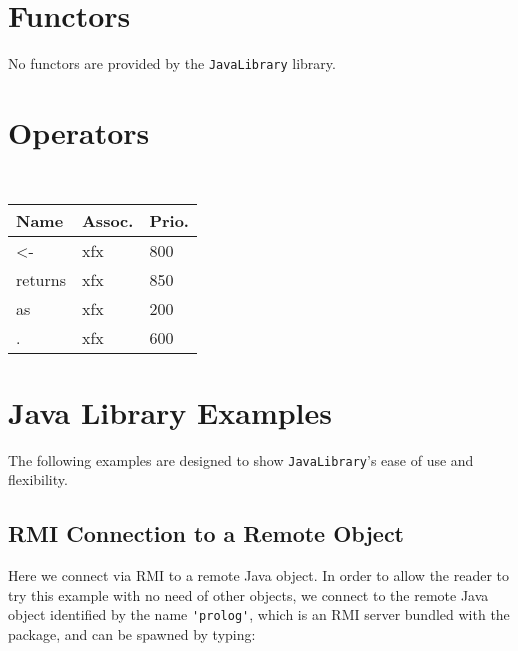 \section{Functors}

No functors are provided by the \texttt{JavaLibrary} library.

\section{Operators}

\begin{table}[h]
    \begin{center}{\small\tt
    \begin{tabular}{p{2cm}|p{1cm}|p{1cm}}\hline\hline
    Name & Assoc. & Prio. \\ \hline\hline
    <-   & xfx & 800\\
    returns     & xfx & 850 \\
    as   & xfx & 200\\
    .   & xfx & 600\\
    \hline\hline
    \end{tabular}
    }\end{center}
\end{table}



\section{Java Library Examples}

The following examples are designed to show \texttt{JavaLibrary}'s
ease of use and flexibility.

\subsection{RMI Connection to a Remote Object}

Here we connect via RMI to a remote Java object.
%
In order to allow the reader to try this example with no need of
other objects, we connect to the remote Java object identified by
the name \verb|'prolog'|, which is an RMI server bundled with
the \tuprolog{} package, and can be spawned by typing:

